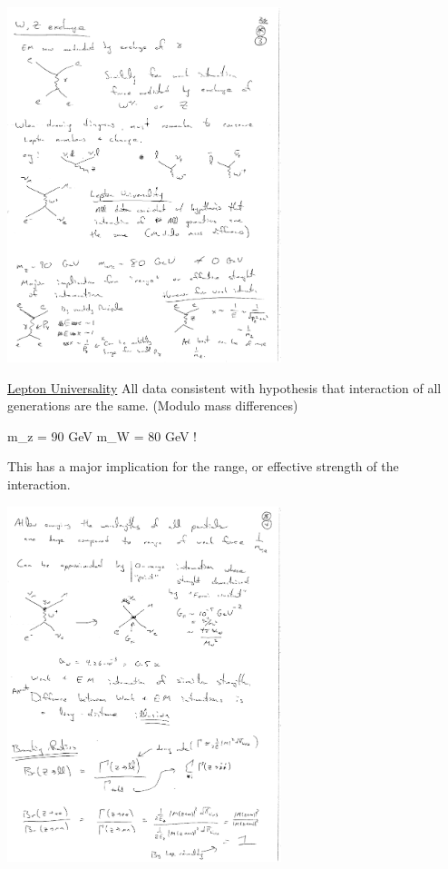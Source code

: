 {\includegraphics[width=0.6\textwidth]{./NuScattering.pdf}   

\underline{Lepton Universality}
All data consistent with hypothesis that interaction of all generations are the same.
(Modulo mass differences)

\be
m_z = 90 GeV \hspace*{0.5in} m_W = 80 GeV    !
\ee

This has a major implication for the range, or effective strength of the interaction.


\includegraphics[width=0.6\textwidth]{./GFermi.pdf}   

}


